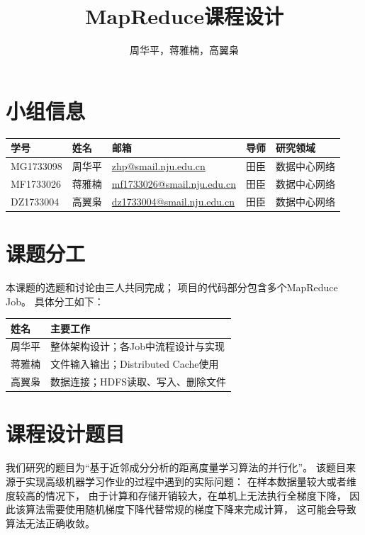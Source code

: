 \documentclass[a4paper,UTF8]{article}
\theoremstyle{definition}
\begin{document}
\title{MapReduce课程设计}
\author{周华平，蒋雅楠，高翼枭}
\maketitle

\section*{小组信息}

\begin{table}[htbp]
  \centering
  \begin{tabular}{l|l|l|l|l}
	\hline
	学号 & 姓名 & 邮箱 & 导师 & 研究领域 \\
	\hline
	MG1733098 & 周华平 & \url{zhp@smail.nju.edu.cn} & 田臣 & 数据中心网络 \\
	MF1733026 & 蒋雅楠 & \url{mf1733026@smail.nju.edu.cn} & 田臣 & 数据中心网络 \\
	DZ1733004 & 高翼枭 & \url{dz1733004@smail.nju.edu.cn} & 田臣 & 数据中心网络 \\
	\hline
  \end{tabular}
\end{table}

\section*{课题分工}

本课题的选题和讨论由三人共同完成；
项目的代码部分包含多个MapReduce Job。
具体分工如下：

\begin{table}[htbp]
  \centering
  \begin{tabular}{l|l}
	\hline
	姓名 & 主要工作 \\
	\hline
	周华平 & 整体架构设计；各Job中流程设计与实现 \\
	蒋雅楠 & 文件输入输出；Distributed Cache使用 \\
	高翼枭 & 数据连接；HDFS读取、写入、删除文件 \\
	\hline
  \end{tabular}
\end{table}

\section*{课程设计题目}

我们研究的题目为“基于近邻成分分析的距离度量学习算法的并行化”。
该题目来源于实现高级机器学习作业的过程中遇到的实际问题：
在样本数据量较大或者维度较高的情况下，
由于计算和存储开销较大，在单机上无法执行全梯度下降，
因此该算法需要使用随机梯度下降代替常规的梯度下降来完成计算，
这可能会导致算法无法正确收敛。
\end{document}
